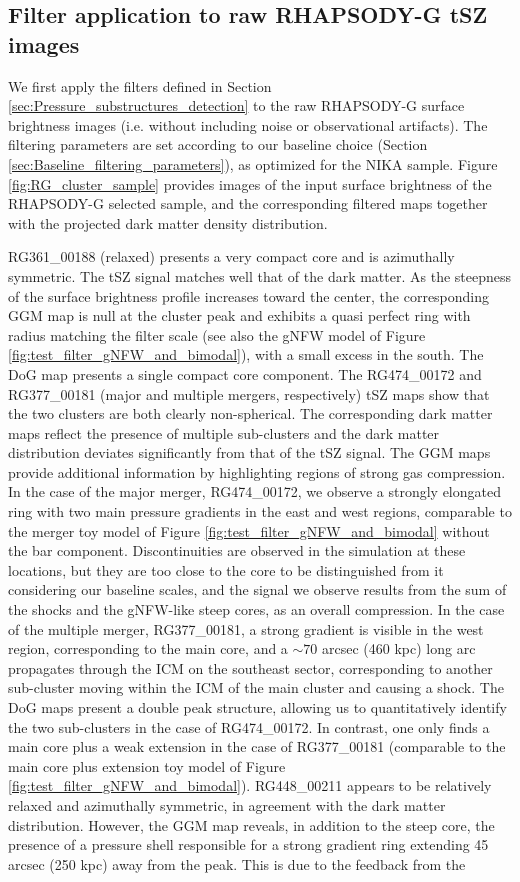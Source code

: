 \documentclass[twocolumn,traditabstract]{aa}
\begin{document}
\subsection{Filter application to raw RHAPSODY-G tSZ images}
We first apply the filters defined in Section \ref{sec:Pressure_substructures_detection} to the raw RHAPSODY-G surface brightness images (i.e. without including noise or observational artifacts). The filtering parameters are set according to our baseline choice (Section \ref{sec:Baseline_filtering_parameters}), as optimized for the NIKA sample. Figure \ref{fig:RG_cluster_sample} provides images of the input surface brightness of the RHAPSODY-G selected sample, and the corresponding filtered maps together with the projected dark matter density distribution. 

RG361\_00188 (relaxed) presents a very compact core and is azimuthally symmetric. The tSZ signal matches well that of the dark matter. As the steepness of the surface brightness profile increases toward the center, the corresponding GGM map is null at the cluster peak and exhibits a quasi perfect ring with radius matching the filter scale (see also the gNFW model of Figure \ref{fig:test_filter_gNFW_and_bimodal}), with a small excess in the south. The DoG map presents a single compact core component. The RG474\_00172 and RG377\_00181 (major and multiple mergers, respectively) tSZ maps show that the two clusters are both clearly non-spherical. The corresponding dark matter maps reflect the presence of multiple sub-clusters and the dark matter distribution deviates significantly from that of the tSZ signal. The GGM maps provide additional information by highlighting regions of strong gas compression. In the case of the major merger, RG474\_00172, we observe a strongly elongated ring with two main pressure gradients in the east and west regions, comparable to the merger toy model of Figure \ref{fig:test_filter_gNFW_and_bimodal} without the bar component. Discontinuities are observed in the simulation at these locations, but they are too close to the core to be distinguished from it considering our baseline scales, and the signal we observe results from the sum of the shocks and the gNFW-like steep cores, as an overall compression. In the case of the multiple merger, RG377\_00181, a strong gradient is visible in the west region, corresponding to the main core, and a $\sim 70$ arcsec (460 kpc) long arc propagates through the ICM on the southeast sector, corresponding to another sub-cluster moving within the ICM of the main cluster and causing a shock. The DoG maps present a double peak structure, allowing us to quantitatively identify the two sub-clusters in the case of RG474\_00172. In contrast, one only finds a main core plus a weak extension in the case of RG377\_00181 (comparable to the main core plus extension toy model of Figure \ref{fig:test_filter_gNFW_and_bimodal}). RG448\_00211 appears to be relatively relaxed and azimuthally symmetric, in agreement with the dark matter distribution. However, the GGM map reveals, in addition to the steep core, the presence of a pressure shell responsible for a strong gradient ring extending 45 arcsec (250 kpc) away from the peak. This is due to the feedback from the 
\end{document}
